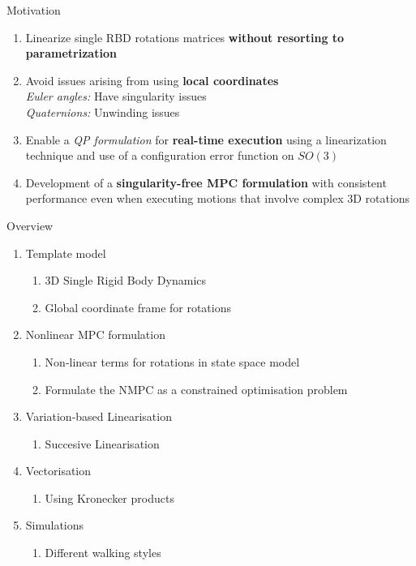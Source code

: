 \documentclass{beamer}
\begin{document}
\begin{frame}{Motivation}
    \begin{enumerate}
        \item Linearize single RBD rotations matrices \textbf{without resorting to parametrization}
        \item Avoid issues arising from using \textbf{local coordinates}\\
            \textit{Euler angles:} Have singularity issues\\
            \textit{Quaternions:} Unwinding issues
        \item Enable a \textit{QP formulation} for \textbf{real-time execution} using a linearization  technique and use of a configuration error function on $SO(3)$
        \item Development of a \textbf{singularity-free MPC formulation} with consistent performance even when executing motions that involve complex 3D rotations
    \end{enumerate}
\end{frame}


\begin{frame}{Overview}
    

    \setlength{\itemsep}{1em}
    \setlength{\parskip}{2pt} 
    \begin{enumerate}\small
        \item Template model
            \begin{enumerate}\scriptsize
                \item 3D Single Rigid Body Dynamics
                \item Global coordinate frame for rotations
            \end{enumerate}
        \item Nonlinear MPC formulation
            \begin{enumerate}\scriptsize
                \item Non-linear terms for rotations in state space model
                \item Formulate the NMPC as a constrained optimisation problem
            \end{enumerate}
        \item Variation-based Linearisation
            \begin{enumerate}\scriptsize
                \item Succesive Linearisation
            \end{enumerate}
        \item Vectorisation
            \begin{enumerate}\scriptsize
                \item Using Kronecker products
            \end{enumerate}
        \item Simulations
            \begin{enumerate}\scriptsize
                \item Different walking styles
            \end{enumerate}
    \end{enumerate}
    
\end{frame}
\end{document}
